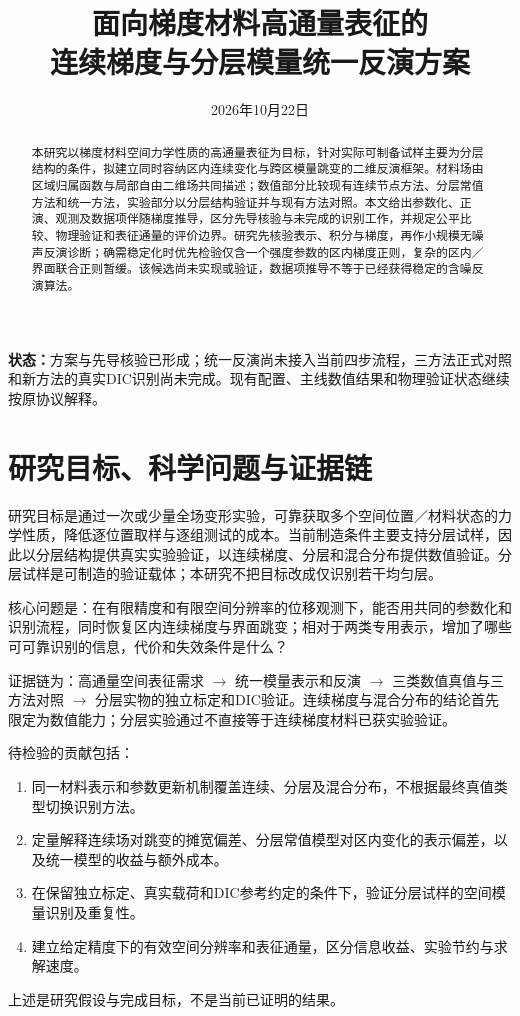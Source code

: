 \documentclass[11pt,a4paper]{ctexart}
\title{面向梯度材料高通量表征的\\连续梯度与分层模量统一反演方案}
\author{}
\date{2026年10月22日}
\begin{document}
\maketitle
\begin{abstract}
本研究以梯度材料空间力学性质的高通量表征为目标，针对实际可制备试样主要为分层结构的条件，拟建立同时容纳区内连续变化与跨区模量跳变的二维反演框架。材料场由区域归属函数与局部自由二维场共同描述；数值部分比较现有连续节点方法、分层常值方法和统一方法，实验部分以分层结构验证并与现有方法对照。本文给出参数化、正演、观测及数据项伴随梯度推导，区分先导核验与未完成的识别工作，并规定公平比较、物理验证和表征通量的评价边界。研究先核验表示、积分与梯度，再作小规模无噪声反演诊断；确需稳定化时优先检验仅含一个强度参数的区内梯度正则，复杂的区内／界面联合正则暂缓。该候选尚未实现或验证，数据项推导不等于已经获得稳定的含噪反演算法。
\end{abstract}

\noindent\textbf{状态：}方案与先导核验已形成；统一反演尚未接入当前四步流程，三方法正式对照和新方法的真实DIC识别尚未完成。现有配置、主线数值结果和物理验证状态继续按原协议解释。

\tableofcontents
\newpage

\section{研究目标、科学问题与证据链}
\label{sec:objective}
研究目标是通过一次或少量全场变形实验，可靠获取多个空间位置／材料状态的力学性质，降低逐位置取样与逐组测试的成本。当前制造条件主要支持分层试样，因此以分层结构提供真实实验验证，以连续梯度、分层和混合分布提供数值验证。分层试样是可制造的验证载体；本研究不把目标改成仅识别若干均匀层。

核心问题是：在有限精度和有限空间分辨率的位移观测下，能否用共同的参数化和识别流程，同时恢复区内连续梯度与界面跳变；相对于两类专用表示，增加了哪些可可靠识别的信息，代价和失效条件是什么？

证据链为：高通量空间表征需求 $\rightarrow$ 统一模量表示和反演 $\rightarrow$ 三类数值真值与三方法对照 $\rightarrow$ 分层实物的独立标定和DIC验证。连续梯度与混合分布的结论首先限定为数值能力；分层实验通过不直接等于连续梯度材料已获实验验证。

待检验的贡献包括：
\begin{enumerate}
\item 同一材料表示和参数更新机制覆盖连续、分层及混合分布，不根据最终真值类型切换识别方法。
\item 定量解释连续场对跳变的摊宽偏差、分层常值模型对区内变化的表示偏差，以及统一模型的收益与额外成本。
\item 在保留独立标定、真实载荷和DIC参考约定的条件下，验证分层试样的空间模量识别及重复性。
\item 建立给定精度下的有效空间分辨率和表征通量，区分信息收益、实验节约与求解速度。
\end{enumerate}
上述是研究假设与完成目标，不是当前已证明的结果。
\end{document}
